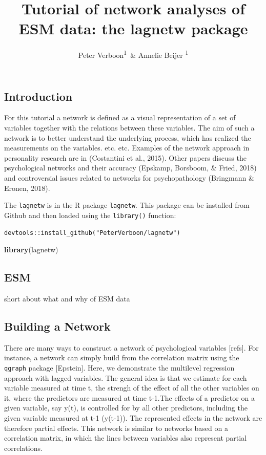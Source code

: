 \documentclass[man,floatsintext]{apa6}
\title{Tutorial of network analyses of ESM data: the lagnetw package}
\author{Peter Verboon\textsuperscript{1}~\& Annelie Beijer \textsuperscript{1 }}
\date{}
\affiliation{
\vspace{0.5cm}
\textsuperscript{1} Open University}
\newenvironment{Shaded}{\begin{snugshade}}{\end{snugshade}}
\newcommand{\KeywordTok}[1]{\textcolor[rgb]{0.13,0.29,0.53}{\textbf{#1}}}
\newcommand{\NormalTok}[1]{#1}
\begin{document}
\maketitle

\subsection{Introduction}\label{introduction}

For this tutorial a network is defined as a visual representation of a
set of variables together with the relations between these variables.
The aim of such a network is to better understand the underlying
process, which has realized the measurements on the variables. etc. etc.
Examples of the network approach in personality research are in
(Costantini et al., 2015). Other papers discuss the psychological
networks and their accuracy (Epskamp, Borsboom, \& Fried, 2018) and
controversial issues related to networks for psychopathology (Bringmann
\& Eronen, 2018).

The \texttt{lagnetw} is in the R package \texttt{lagnetw}. This package
can be installed from Github and then loaded using the
\texttt{library()} function:

\texttt{devtools::install\_github("PeterVerboon/lagnetw")}

\begin{Shaded}
\begin{Highlighting}[]
\KeywordTok{library}\NormalTok{(lagnetw)}
\end{Highlighting}
\end{Shaded}

\subsection{ESM}\label{esm}

short about what and why of ESM data

\subsection{Building a Network}\label{building-a-network}

There are many ways to construct a network of psychological variables
{[}refs{]}. For instance, a network can simply build from the
correlation matrix using the \texttt{qgraph} package {[}Epstein{]}.
Here, we demonstrate the multilevel regression approach with lagged
variables. The general idea is that we estimate for each variable
measured at time t, the strengh of the effect of all the other variables
on it, where the predictors are measured at time t-1.The effects of a
predictor on a given variable, say y(t), is controlled for by all other
predictors, including the given variable measured at t-1 (y(t-1)). The
represented effects in the network are therefore partial effects. This
network is similar to networks based on a correlation matrix, in which
the lines between variables also represent partial correlations.
\end{document}
